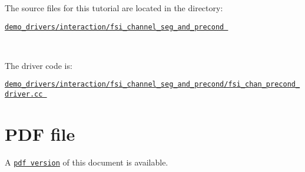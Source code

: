 \begin{DoxyItemize}
\item The source files for this tutorial are located in the directory\+:~\newline
~\newline
\begin{center} \href{../../../../demo_drivers/interaction/fsi_channel_seg_and_precond/}{\tt demo\+\_\+drivers/interaction/fsi\+\_\+channel\+\_\+seg\+\_\+and\+\_\+precond } \end{center} ~\newline

\item The driver code is\+: ~\newline
~\newline
\begin{center} \href{../../../../demo_drivers/interaction/fsi_channel_seg_and_precond/fsi_chan_precond_driver.cc}{\tt demo\+\_\+drivers/interaction/fsi\+\_\+channel\+\_\+seg\+\_\+and\+\_\+precond/fsi\+\_\+chan\+\_\+precond\+\_\+driver.\+cc } \end{center} 
\end{DoxyItemize}



 

 \hypertarget{index_pdf}{}\section{P\+D\+F file}\label{index_pdf}
A \href{../latex/refman.pdf}{\tt pdf version} of this document is available. 
